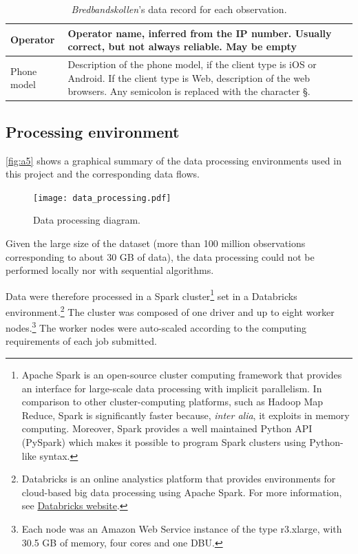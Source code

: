 \documentclass[12pt]{article}
\begin{document}
\begin{table}[H]
\begin{tabular}{|>{\raggedright\arraybackslash}m{30mm}|m{120mm}|}
\hline 
Operator & Operator name, inferred from the IP number. Usually correct, but not always reliable. May be empty  \\ 
\hline 
Phone model & Description of the phone model, if the client type is iOS or Android. If the client type is Web, description of the web browsers. Any semicolon is replaced with the character §. \\ 
\hline 
\end{tabular} 
\egroup
  \caption{\textit{Bredbandskollen}'s data record for each observation.}
  \label{tab:t2}  
\end{table}

\subsection{Processing environment}

\autoref{fig:a5} shows a graphical summary of the data processing environments used in this project and the corresponding data flows.

\begin{figure}[H]
    \centering
        \texttt{[image: data\_processing.pdf]}
        \caption{Data processing diagram.}
        \label{fig:a6}
\end{figure}   

Given the large size of the dataset (more than 100 million observations corresponding to about 30 GB of data), the data processing could not be performed locally nor with sequential algorithms.     

Data were therefore processed in a Spark cluster\footnote{Apache Spark is an open-source cluster computing framework that provides an interface for large-scale data processing with implicit parallelism. In comparison to other cluster-computing platforms, such as Hadoop Map Reduce, Spark is significantly faster because, \textit{inter alia}, it exploits in memory computing. Moreover, Spark provides a well maintained Python API (PySpark) which makes it possible to program Spark clusters using Python-like syntax.} set in a Databricks environment.\footnote{Databricks is an online analystics platform that provides environments for cloud-based big data processing using Apache Spark. For more information, see \href{https://databricks.com/}{Databricks website}.} The cluster was composed of one driver and up to eight worker nodes.\footnote{Each node was an Amazon Web Service instance of the type r3.xlarge, with 30.5 GB of memory, four cores and one DBU.} The worker nodes were auto-scaled according to the computing requirements of each job submitted.  
\end{document}
